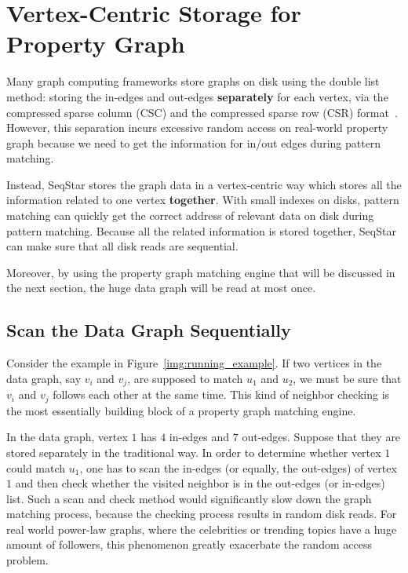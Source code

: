 \section{Vertex-Centric Storage for Property Graph}\label{sec:storage}

Many graph computing frameworks store graphs on disk using the double list method:
storing the in-edges and out-edges \textbf{separately} for each vertex,
via the compressed sparse column (CSC) and the compressed sparse row (CSR) format~\cite{DBLP:conf/sc/PearceGA10}.
However, this separation incurs excessive random access on real-world property graph because we need to get the information for in/out edges during pattern matching.

Instead, SeqStar stores the graph data in a vertex-centric way which stores all the information related to one vertex \textbf{together}.
With small indexes on disks, pattern matching can quickly get the correct address of relevant data on disk during pattern matching. Because all the related information is stored together, SeqStar can make sure that all disk reads are sequential.

Moreover, by using the property graph matching engine that will be discussed in the next section,
the huge data graph will be read at most once.
\subsection{Scan the Data Graph Sequentially}

Consider the example in Figure~\ref{img:running_example}.
If two vertices in the data graph, say $v_i$ and $v_j$, are supposed to match $u_1$ and $u_2$,
we must be sure that $v_i$ and $v_j$ follows each other at the same time.
This kind of neighbor checking is the most essentially building block of a property graph matching engine.

In the data graph, vertex $1$ has $4$ in-edges and $7$ out-edges.
Suppose that they are stored separately in the traditional way.
In order to determine whether vertex $1$ could match $u_1$,
one has to scan the in-edges (or equally, the out-edges) of vertex $1$ and then check whether the visited neighbor is in the out-edges (or in-edges) list.
Such a scan and check method would significantly slow down the graph matching process,
because the checking process results in random disk reads.
For real world power-law graphs, where the celebrities or trending topics have a huge amount of followers, this phenomenon greatly exacerbate the random access problem.

